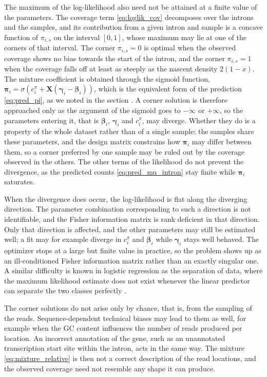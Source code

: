 \documentclass[11pt]{article}
\begin{document}
	The maximum of the log-likelihood also need not be attained at a finite value of the parameters. The coverage term \eqref{eq:loglik_cov} decomposes over the introns and the samples, and its contribution from a given intron and sample is a concave function of $\pi_{i,s}$ on the interval $[0,1]$, whose maximum may lie at one of the corners of that interval. The corner $\pi_{i,s} = 0$ is optimal when the observed coverage shows no bias towards the start of the intron, and the corner $\pi_{i,s} = 1$ when the coverage falls off at least as steeply as the nascent density $2(1-x)$. The mixture coefficient is obtained through the sigmoid function, $\boldsymbol{\pi}_i = \sigma ( c^{\pi}_{i} + \boldsymbol{X} (\boldsymbol{\gamma}_i - \boldsymbol{\beta}_i) )$, which is the equivalent form of the prediction \eqref{eq:pred_pi}, as we noted in the section . A corner solution is therefore approached only as the argument of the sigmoid goes to $-\infty$ or $+\infty$, so the parameters entering it, that is $\boldsymbol{\beta}_i$, $\boldsymbol{\gamma}_i$ and $c^{\pi}_{i}$, may diverge. Whether they do is a property of the whole dataset rather than of a single sample: the samples share these parameters, and the design matrix constrains how $\boldsymbol{\pi}_i$ may differ between them, so a corner preferred by one sample may be ruled out by the coverage observed in the others. The other terms of the likelihood do not prevent the divergence, as the predicted counts \eqref{eq:pred_mu_intron} stay finite while $\boldsymbol{\pi}_i$ saturates.

	When the divergence does occur, the log-likelihood is flat along the diverging direction. The parameter combination corresponding to such a direction is not identifiable, and the Fisher information matrix is rank deficient in that direction. Only that direction is affected, and the other parameters may still be estimated well; a fit may for example diverge in $c^{\pi}_{i}$ and $\boldsymbol{\beta}_i$ while $\boldsymbol{\gamma}_i$ stays well behaved. The optimizer stops at a large but finite value in practice, so the problem shows up as an ill-conditioned Fisher information matrix rather than an exactly singular one. A similar difficulty is known in logistic regression as the separation of data, where the maximum likelihood estimate does not exist whenever the linear predictor can separate the two classes perfectly \citep{albertExistenceMaximumLikelihood1984}.

	The corner solutions do not arise only by chance, that is, from the sampling of the reads. Sequence-dependent technical biases may lead to them as well, for example when the GC content influences the number of reads produced per location. An incorrect annotation of the gene, such as an unannotated transcription start site within the intron, acts in the same way. The mixture \eqref{eq:mixture_relative} is then not a correct description of the read locations, and the observed coverage need not resemble any shape it can produce.
\end{document}
